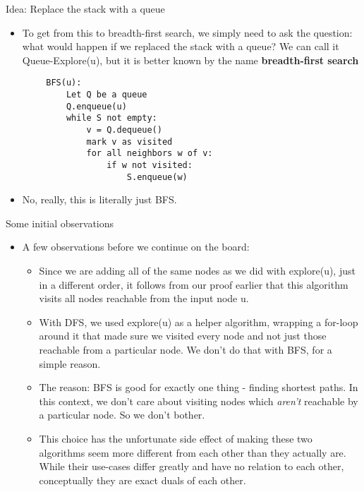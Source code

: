 \documentclass{beamer}
\begin{document}
\begin{frame}[fragile]{Idea: Replace the stack with a queue}
    \begin{itemize}
        \item To get from this to breadth-first search, we simply need to ask the question: what would happen if we replaced the stack with a queue? We can call it Queue-Explore(u), but it is better known by the name \textbf{breadth-first search}
    \end{itemize}
    \begin{lstlisting}
        BFS(u):
            Let Q be a queue
            Q.enqueue(u)
            while S not empty:
                v = Q.dequeue()
                mark v as visited
                for all neighbors w of v:
                    if w not visited:
                        S.enqueue(w)
    \end{lstlisting}
    \begin{itemize}
        \item No, really, this is literally just BFS.  
    \end{itemize}
\end{frame}

\begin{frame}{Some initial observations}
    \begin{itemize}
        \item A few observations before we continue on the board:
        \begin{itemize}
            \item Since we are adding all of the same nodes as we did with explore(u), just in a different order, it follows from our proof earlier that this algorithm visits all nodes reachable from the input node u. 
            \item With DFS, we used explore(u) as a helper algorithm, wrapping a for-loop around it that made sure we visited every node and not just those reachable from a particular node. We don't do that with BFS, for a simple reason. 
            \item The reason: BFS is good for exactly one thing - finding shortest paths. In this context, we don't care about visiting nodes which \emph{aren't} reachable by a particular node. So we don't bother. 
            \item This choice has the unfortunate side effect of making these two algorithms seem more different from each other than they actually are. While their use-cases differ greatly and have no relation to each other, conceptually they are exact duals of each other.
        \end{itemize}
    \end{itemize}
\end{frame}
\end{document}
